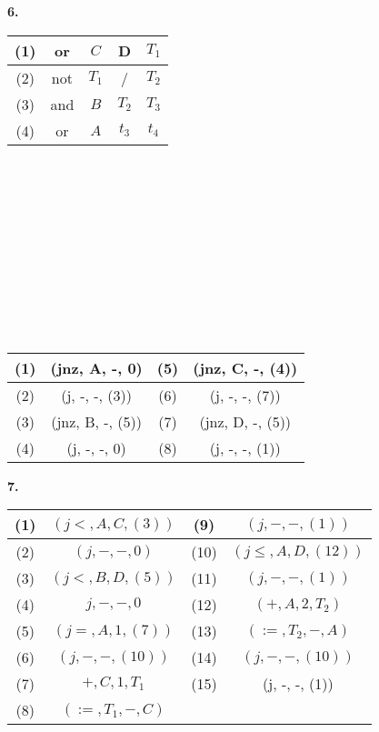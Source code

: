 \documentclass{article}
\begin{document}
\textbf{6.}
\begin{table}[h]
    \centering
    \begin{tabular}{|c|c|c|c|c|}
        \hline
        (1) & or & $C$ & D & $T_1$\\
        \hline
        (2) & not & $T_1$ & / & $T_2$\\
        \hline
        (3) & and & $B$ & $T_2$ & $T_3$\\
        \hline
        (4) & or & $A$ & $t_3$ &$t_4$\\
        \hline
    \end{tabular}
\end{table}
\\ \\ \\ \\ \\ \\ \\ \\ \\ \\
\begin{table}[h]
    \centering
    \begin{tabular}{|c|c|c|c|}
        \hline
        (1) & (jnz, A, -, 0) & (5) & (jnz, C, -, (4))\\
        \hline
        (2) & (j, -, -, (3)) & (6) & (j, -, -, (7))\\
        \hline
        (3) & (jnz, B, -, (5)) & (7) & (jnz, D, -, (5))\\ 
        \hline
        (4) & (j, -, -, 0) & (8) & (j, -, -, (1))\\
        \hline
    \end{tabular}
\end{table}

\textbf{7.}
\begin{table}[h]
    \centering
    \begin{tabular}{|c|c|c|c|}
        \hline
        (1) & $(j<, A, C, (3))$ & (9) & $(j, -, -, (1))$\\
        \hline
        (2) & $(j, -, -, 0)$ & (10) & $(j\leq, A, D, (12))$\\
        \hline
        (3) & $(j<, B, D, (5))$ & (11) & $(j, -, -, (1))$\\ 
        \hline
        (4) & $j, -, -, 0$ & (12) & $(+, A, 2, T_2)$\\ 
        \hline
        (5) & $(j=, A, 1, (7))$ & (13) & $(:=, T_2, -, A)$\\ 
        \hline
        (6) & $(j, -, -, (10))$ & (14) & $(j, -, -, (10))$\\ 
        \hline
        (7) & $+, C, 1, T_1$ & (15) & (j, -, -, (1))\\ 
        \hline
        (8) & $(:=, T_1, -, C)$ & & \\
        \hline
    \end{tabular}    
\end{table}
\end{document}
